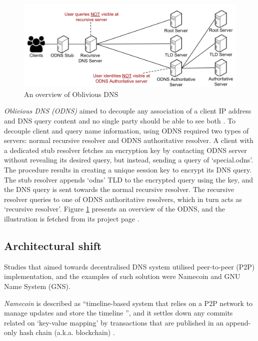 \begin{figure}[h!]
    \begin{center}
    \includegraphics*[width=0.9\columnwidth]{img/ODNSoverview}
    \end{center}
    \caption{An overview of Oblivious DNS \cite{ODNSwebsite}}
    \label{odnsoverview}
\end{figure}
\textit{Oblivious DNS (ODNS)} aimed to decouple any association of a client IP address and DNS query content and no single party should be able to see both \cite{annee-dprive-oblivious-dns-00}.
To decouple client and query name information, using ODNS required two types of servers: normal recursive resolver and ODNS authoritative resolver.
A client with a dedicated stub resolver fetches an encryption key by contacting ODNS server without revealing its desired query, but instead, sending a query of `special.odns'.
The procedure results in creating a unique session key to encrypt its DNS query. The stub resolver appends `odns' TLD to the encrypted query using the key, and the DNS query is sent towards the normal recursive resolver. The recursive resolver queries to one of ODNS authoritative resolvers, which in turn acts as `recursive resolver'.
Figure \ref{odnsoverview} presents an overview of the ODNS, and the illustration is fetched from its project page \cite{ODNSwebsite}.

\subsection{Architectural shift}
Studies that aimed towards decentralised DNS system utilised peer-to-peer (P2P) implementation, and the examples of such solution were Namecoin and GNU Name System (GNS).

\textit{Namecoin} \cite{loibl2014namecoin} is described as ``timeline-based system that relies on a P2P network to manage updates and store the timeline \cite{grothoff2017nsa}'', and it settles down any commits related on `key-value mapping' by transactions that are published in an append-only hash chain (a.k.a. blockchain) \cite{kalodner2015empirical}.


